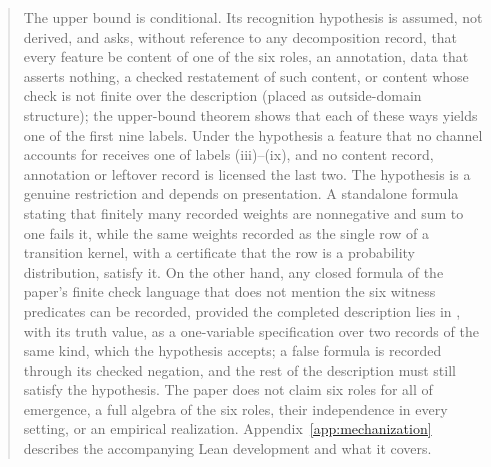 \begin{abstract}
The upper bound is conditional. Its recognition hypothesis is assumed, not
derived, and asks, without reference to any decomposition record, that every
feature be content of one of the six roles, an annotation, data that asserts
nothing, a checked restatement of such content, or content whose check is not
finite over the description (placed as outside-domain structure); the
upper-bound theorem shows that each of these ways yields one of the first nine
labels. Under the hypothesis a feature that no channel accounts for receives
one of labels (iii)--(ix), and no content record, annotation or leftover record
is licensed the last two. The hypothesis is a genuine restriction and depends
on presentation. A standalone formula stating that finitely many recorded
weights are nonnegative and sum to one fails it, while the same weights
recorded as the single row of a transition kernel, with a certificate that the
row is a probability distribution, satisfy it. On the other hand, any closed formula
of the paper's finite check language that does not mention the six witness
predicates can be recorded, provided the completed description lies in \FATCD{}, with its truth value, as a one-variable
specification over two records of the same kind, which the hypothesis accepts;
a false formula is recorded through its checked negation, and the rest of the
description must still satisfy the hypothesis. The paper does not claim six roles
for all of emergence, a full algebra of the six roles, their independence in
every setting, or an empirical realization.
Appendix~\ref{app:mechanization} describes the accompanying Lean
development and what it covers.
\end{abstract}
